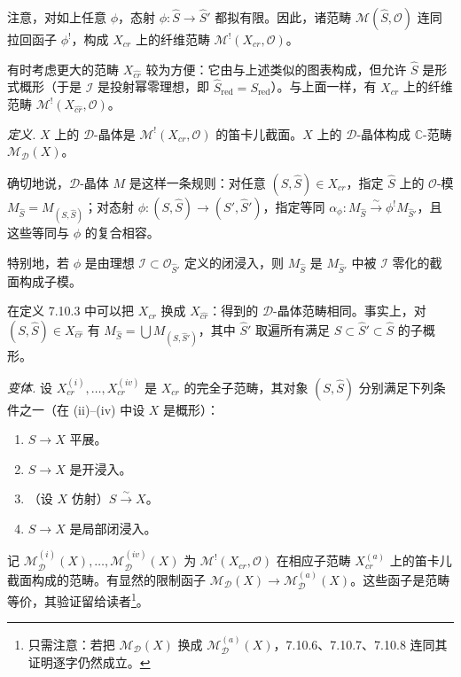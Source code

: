 注意，对如上任意 $\phi$，态射 $\phi:\hat S\to\hat S'$ 都拟有限。因此，诸范畴 $\mathcal{M}(\hat S,\mathcal{O})$ 连同拉回函子 $\phi^{!}$，构成 $X_{cr}$ 上的纤维范畴 $\mathcal{M}^{!}(X_{cr},\mathcal{O})$。

有时考虑更大的范畴 $X_{\widehat{cr}}$ 较为方便：它由与上述类似的图表构成，但允许 $\hat S$ 是形式概形（于是 $\mathcal{I}$ 是投射幂零理想，即 $\hat S_{\mathrm{red}}=S_{\mathrm{red}}$）。与上面一样，有 $X_{\widehat{cr}}$ 上的纤维范畴 $\mathcal{M}^{!}(X_{\widehat{cr}},\mathcal{O})$。

 \emph{定义.} $X$ 上的 $\mathcal{D}$-晶体是 $\mathcal{M}^{!}(X_{cr},\mathcal{O})$ 的笛卡儿截面。$X$ 上的 $\mathcal{D}$-晶体构成 $\mathbb{C}$-范畴 $\mathcal{M}_{\mathcal{D}}(X)$。

确切地说，$\mathcal{D}$-晶体 $M$ 是这样一条规则：对任意 $(S,\hat S)\in X_{cr}$，指定 $\hat S$ 上的 $\mathcal{O}$-模 $M_{\hat S}=M_{(S,\hat S)}$；对态射 $\phi:(S,\hat S)\to(S',\hat S')$，指定等同 $\alpha_{\phi}:M_{\hat S}\xrightarrow{\sim}\phi^{!}M_{\hat S'}$，且这些等同与 $\phi$ 的复合相容。

特别地，若 $\phi$ 是由理想 $\mathcal{I}\subset\mathcal{O}_{\hat S'}$ 定义的闭浸入，则 $M_{\hat S}$ 是 $M_{\hat S'}$ 中被 $\mathcal{I}$ 零化的截面构成子模。

在定义 7.10.3 中可以把 $X_{cr}$ 换成 $X_{\widehat{cr}}$：得到的 $\mathcal{D}$-晶体范畴相同。事实上，对 $(S,\hat S)\in X_{\widehat{cr}}$ 有 $M_{\hat S}=\bigcup M_{(S,\hat S')}$，其中 $\hat S'$ 取遍所有满足 $S\subset\hat S'\subset\hat S$ 的子概形。

 \emph{变体.} 设 $X_{cr}^{(i)},\ldots,X_{cr}^{(iv)}$ 是 $X_{cr}$ 的完全子范畴，其对象 $(S,\hat S)$ 分别满足下列条件之一（在 (ii)--(iv) 中设 $X$ 是概形）：
\begin{enumerate}[label=(\roman*),leftmargin=2.2em]
\item $S\to X$ 平展。
\item $S\to X$ 是开浸入。
\item （设 $X$ 仿射）$S\xrightarrow{\sim}X$。
\item $S\to X$ 是局部闭浸入。
\end{enumerate}

记 $\mathcal{M}^{(i)}_{\mathcal{D}}(X),\ldots,\mathcal{M}^{(iv)}_{\mathcal{D}}(X)$ 为 $\mathcal{M}^{!}(X_{cr},\mathcal{O})$ 在相应子范畴 $X_{cr}^{(a)}$ 上的笛卡儿截面构成的范畴。有显然的限制函子 $\mathcal{M}_{\mathcal{D}}(X)\to\mathcal{M}^{(a)}_{\mathcal{D}}(X)$。这些函子是范畴等价，其验证留给读者\footnote{只需注意：若把 $\mathcal{M}_{\mathcal{D}}(X)$ 换成 $\mathcal{M}^{(a)}_{\mathcal{D}}(X)$，7.10.6、7.10.7、7.10.8 连同其证明逐字仍然成立。}。

